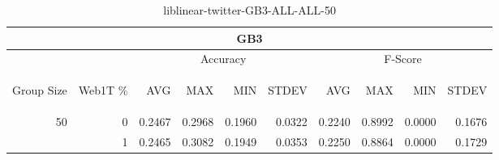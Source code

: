 \begin{center}
\begin{table}[htbp]
\begin{tabular}{ | r | r | r | r | r | r | r | r | r | r |}
\hline
\multicolumn{10}{|c|}{GB3}\\
\hline
 & & \multicolumn{4}{|c|}{Accuracy} & \multicolumn{4}{|c|}{F-Score}\\ \cline{3-10}
\begin{sideways}Group Size\end{sideways} & \begin{sideways}Web1T \%\end{sideways} & \begin{sideways}AVG\end{sideways} & \begin{sideways}MAX\end{sideways} & \begin{sideways}MIN\end{sideways} & \begin{sideways}STDEV\end{sideways} & \begin{sideways}AVG\end{sideways} & \begin{sideways}MAX\end{sideways} & \begin{sideways}MIN\end{sideways} & \begin{sideways}STDEV\end{sideways}\\
\hline
\multirow{1}{*}{50}
 & 0 & 0.2467 & 0.2968 & 0.1960 & 0.0322 & 0.2240 & 0.8992 & 0.0000 & 0.1676\\ \cline{2-10}
 & 1 & 0.2465 & 0.3082 & 0.1949 & 0.0353 & 0.2250 & 0.8864 & 0.0000 & 0.1729\\ \cline{2-10}
\hline
\end{tabular}
\caption{liblinear-twitter-GB3-ALL-ALL-50}
\label{table:liblinear-twitter-GB3-ALL-ALL-50}
\end{table}
\end{center}


